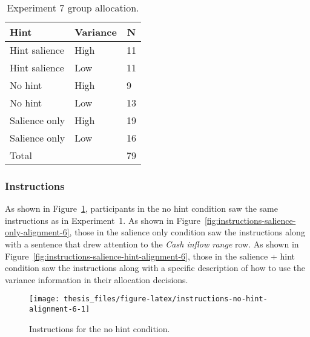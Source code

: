 \documentclass[a4paper, nobind]{templates/ociamthesis}
\theoremstyle{definition}
\theoremstyle{definition}
\theoremstyle{definition}
\theoremstyle{definition}
\theoremstyle{remark}
\begin{document}
\begin{table}[tbp]

\begin{center}
\begin{threeparttable}

\caption{\label{tab:condition-allocation-alignment-6}Experiment 7 group allocation.}

\begin{tabular}{lll}
\toprule
Hint & \multicolumn{1}{c}{Variance} & \multicolumn{1}{c}{N}\\
\midrule
Hint salience & High & 11\\
Hint salience & Low & 11\\
No hint & High & 9\\
No hint & Low & 13\\
Salience only & High & 19\\
Salience only & Low & 16\\
Total &  & 79\\
\bottomrule
\end{tabular}

\end{threeparttable}
\end{center}

\end{table}

\subsubsection{Instructions}

As shown in Figure~\ref{fig:instructions-no-hint-alignment-6}, participants in
the no hint condition saw the same instructions as in Experiment~1. As shown in
Figure~\ref{fig:instructions-salience-only-alignment-6}, those in the salience
only condition saw the instructions along with a sentence that drew attention to
the \emph{Cash inflow range} row. As shown in
Figure~\ref{fig:instructions-salience-hint-alignment-6}, those in the
salience + hint condition saw the instructions along with a specific description
of how to use the variance information in their allocation decisions.



\begin{figure}
\texttt{[image: thesis\_files/figure-latex/instructions-no-hint-alignment-6-1]} \caption{Instructions for the no hint condition.}\label{fig:instructions-no-hint-alignment-6}
\end{figure}
\end{document}
